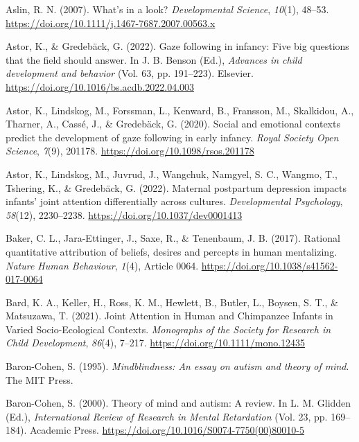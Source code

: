 \documentclass[
]{scrbook}
\newlength{\cslhangindent}
\newenvironment{CSLReferences}[2] %
 {\begin{list}{}{%
  \setlength{\itemindent}{0pt}
  \setlength{\leftmargin}{0pt}
  \setlength{\parsep}{0pt}
  \ifodd #1
   \setlength{\leftmargin}{\cslhangindent}
   \setlength{\itemindent}{-1\cslhangindent}
  \fi
  \setlength{\itemsep}{#2\baselineskip}}}
 {\end{list}}
\begin{document}
\begin{CSLReferences}{1}{0}
Aslin, R. N. (2007). What's in a look? \emph{Developmental Science}, \emph{10}(1), 48--53. \url{https://doi.org/10.1111/j.1467-7687.2007.00563.x}

Astor, K., \& Gredebäck, G. (2022). Gaze following in infancy: {Five} big questions that the field should answer. In J. B. Benson (Ed.), \emph{Advances in child development and behavior} (Vol. 63, pp. 191--223). Elsevier. \url{https://doi.org/10.1016/bs.acdb.2022.04.003}

Astor, K., Lindskog, M., Forssman, L., Kenward, B., Fransson, M., Skalkidou, A., Tharner, A., Cassé, J., \& Gredebäck, G. (2020). Social and emotional contexts predict the development of gaze following in early infancy. \emph{Royal Society Open Science}, \emph{7}(9), 201178. \url{https://doi.org/10.1098/rsos.201178}

Astor, K., Lindskog, M., Juvrud, J., Wangchuk, Namgyel, S. C., Wangmo, T., Tshering, K., \& Gredebäck, G. (2022). Maternal postpartum depression impacts infants' joint attention differentially across cultures. \emph{Developmental Psychology}, \emph{58}(12), 2230--2238. \url{https://doi.org/10.1037/dev0001413}

Baker, C. L., Jara-Ettinger, J., Saxe, R., \& Tenenbaum, J. B. (2017). Rational quantitative attribution of beliefs, desires and percepts in human mentalizing. \emph{Nature Human Behaviour}, \emph{1}(4), Article 0064. \url{https://doi.org/10.1038/s41562-017-0064}

Bard, K. A., Keller, H., Ross, K. M., Hewlett, B., Butler, L., Boysen, S. T., \& Matsuzawa, T. (2021). Joint {Attention} in {Human} and {Chimpanzee Infants} in {Varied Socio-Ecological Contexts}. \emph{Monographs of the Society for Research in Child Development}, \emph{86}(4), 7--217. \url{https://doi.org/10.1111/mono.12435}

Baron-Cohen, S. (1995). \emph{Mindblindness: {An} essay on autism and theory of mind}. The MIT Press.

Baron-Cohen, S. (2000). Theory of mind and autism: {A} review. In L. M. Glidden (Ed.), \emph{International {Review} of {Research} in {Mental Retardation}} (Vol. 23, pp. 169--184). Academic Press. \url{https://doi.org/10.1016/S0074-7750(00)80010-5}


\end{CSLReferences}
\end{document}
